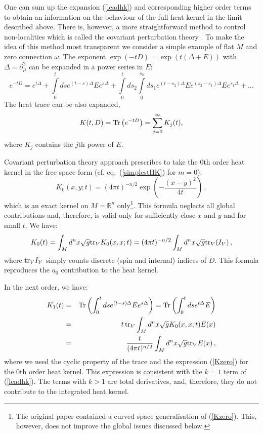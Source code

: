 One can sum up the expansion (\ref{leadhk}) and corresponding higher
order terms to obtain an information on the behaviour of the full
heat kernel in the limit described above. There is, however, a more
straightforward method to control non-localities which is called
the covariant perturbation theory 
\cite{Barvinsky:1987uw,Barvinsky:1990up,Barvinsky:1990uq}. To make the
idea of this method most transparent we consider a simple example
of flat $M$ and zero connection $\omega$. The exponent
$\exp (-tD)=\exp (t(\Delta + E))$ with $\Delta =\partial_\mu^2$
can be expanded in a power series
in $E$:
\begin{equation}
e^{-tD}=e^{t\Delta} + \int\limits_0^t ds e^{(t-s)\Delta} E e^{s\Delta}
+\int\limits_0^t ds_2 \int\limits_0^{s_2} ds_1
e^{(t-s_2)\Delta}E e^{(s_2-s_1)\Delta} E e^{s_1\Delta} +\dots
\label{pertex}
\end{equation}
The heat trace can be also expanded,
\begin{equation}
K(t,D)={\rm Tr}\left( e^{-tD}\right)=
\sum_{j=0}^\infty K_j(t),\label{pexhtr}
\end{equation}
where $K_j$ contains the $j$th power of $E$.

Covariant perturbation theory approach prescribes to take the
$0$th order heat kernel in the free space form (cf. eq.\ 
(\ref{simplestHK}) for $m=0$):
\begin{equation}
K_0(x,y;t)=(4\pi t)^{-n/2} \exp
\left( -\frac{(x-y)^2}{4t} \right) \,,\label{Kzero}
\end{equation}
which is an exact kernel on $M=\mathbb{R}^n$ only\footnote{The
original paper \cite{Barvinsky:1987uw} contained a curved space
generalisation of (\ref{Kzero}). This, however, does not improve
the global issues discussed below.}. This formula neglects all
global contributions and, therefore, is valid only for sufficiently
close $x$ and $y$ and for small $t$. We have:
\begin{equation}
K_0(t)=\int_M d^nx\sqrt{g} {\rm tr}_V K_0(x,x;t)=(4\pi t)^{-n/2} \int_M d^nx\sqrt{g} {\rm tr}_V (I_V)
\,,\label{trKzero}
\end{equation}
where ${\rm tr}_V I_V$ simply counts discrete (spin and internal) 
indices of $D$. This formula reproduces the $a_0$ contribution
to the heat kernel.

In the next order, we have:
\begin{eqnarray}
K_1(t)=&&{\rm Tr} \left( \int_0^t ds e^{(t-s)\Delta}Ee^{s\Delta}
\right)=
{\rm Tr}\left( \int_0^t ds e^{t \Delta} E \right) \nonumber \\
=&& t\, {\rm tr}_V \int_M d^nx\sqrt{g} K_0 (x,x;t) E(x) \nonumber\\
=&&\frac t{(4\pi t)^{n/2}}
\int_M d^nx\sqrt{g} {\rm tr}_V E(x) \,,\label{Kone}
\end{eqnarray}
where we used the cyclic property of the trace and the expression
(\ref{Kzero}) for the $0$th order heat kernel. This expression is
consistent with the $k=1$ term of (\ref{leadhk}). The terms with
$k>1$ are total derivatives, and, therefore, they do not contribute
to the integrated heat kernel. 

